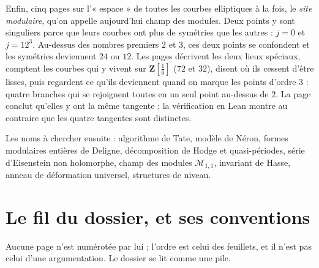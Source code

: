 \documentclass[11pt,a4paper]{article}
\begin{document}
\begin{resume}
Enfin, cinq pages sur l'« espace » de toutes les courbes elliptiques à la fois,
le \emph{site modulaire}, qu'on appelle aujourd'hui champ des modules. Deux
points y sont singuliers parce que leurs courbes ont plus de symétries que les
autres : $j=0$ et $j=12^3$. Au-dessus des nombres premiers $2$ et $3$, ces deux
points se confondent et les symétries deviennent $24$ ou $12$. Les pages
décrivent les deux lieux spéciaux, comptent les courbes qui y vivent sur
$\mathbf{Z}[\tfrac16]$ ($72$ et $32$), disent où ils cessent d'être lisses, puis
regardent ce qu'ils deviennent quand on marque les points d'ordre $3$ : quatre
branches qui se rejoignent toutes en un seul point au-dessus de $2$. La page
conclut qu'elles y ont la même tangente ; la vérification en Lean montre au
contraire que les quatre tangentes sont distinctes.

Les noms à chercher ensuite : algorithme de Tate, modèle de Néron, formes
modulaires entières de Deligne, décomposition de Hodge et quasi-périodes,
série d'Eisenstein non holomorphe, champ des modules $\mathcal{M}_{1,1}$,
invariant de Hasse, anneau de déformation universel, structures de niveau.

\end{resume}

\section*{Le fil du dossier, et ses conventions}

Aucune page n'est numérotée par lui ; l'ordre est celui des feuillets, et il
n'est pas celui d'une argumentation. Le dossier se lit comme une pile.
\end{document}
